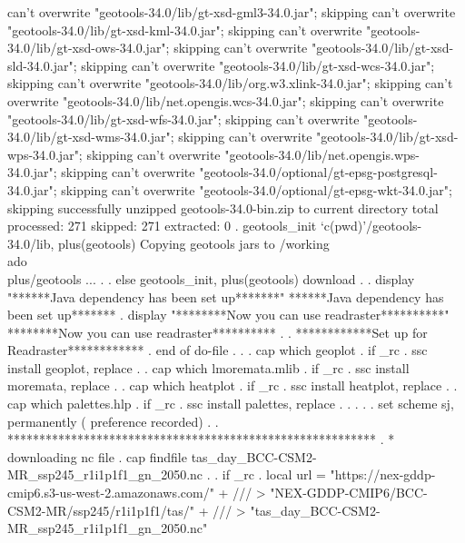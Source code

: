     can't overwrite "geotools-34.0/lib/gt-xsd-gml3-34.0.jar"; skipping
    can't overwrite "geotools-34.0/lib/gt-xsd-kml-34.0.jar"; skipping
    can't overwrite "geotools-34.0/lib/gt-xsd-ows-34.0.jar"; skipping
    can't overwrite "geotools-34.0/lib/gt-xsd-sld-34.0.jar"; skipping
    can't overwrite "geotools-34.0/lib/gt-xsd-wcs-34.0.jar"; skipping
    can't overwrite "geotools-34.0/lib/org.w3.xlink-34.0.jar"; skipping
    can't overwrite "geotools-34.0/lib/net.opengis.wcs-34.0.jar"; skipping
    can't overwrite "geotools-34.0/lib/gt-xsd-wfs-34.0.jar"; skipping
    can't overwrite "geotools-34.0/lib/gt-xsd-wms-34.0.jar"; skipping
    can't overwrite "geotools-34.0/lib/gt-xsd-wps-34.0.jar"; skipping
    can't overwrite "geotools-34.0/lib/net.opengis.wps-34.0.jar"; skipping
    can't overwrite "geotools-34.0/optional/gt-epsg-postgresql-34.0.jar"; skipping
    can't overwrite "geotools-34.0/optional/gt-epsg-wkt-34.0.jar"; skipping
{\smallskip}
successfully unzipped geotools-34.0-bin.zip to current directory
total processed:  271
        skipped:  271
      extracted:  0
.      geotools_init `c(pwd)'/geotools-34.0/lib, plus(geotools) 
Copying geotools jars to /working\\ado\\plus/geotools ...
. {\rbr}
{\smallskip}
. else geotools_init, plus(geotools) download
{\smallskip}
. 
. display "******Java dependency has been set up*******"
******Java dependency has been set up*******
{\smallskip}
. display "********Now you can use readraster**********"
********Now you can use readraster**********
{\smallskip}
. 
. ************Set up for Readraster************
. 
end of do-file
. {\rbr}
{\smallskip}
. 
. cap which geoplot
{\smallskip}
. if _rc {\lbr}
.    ssc install geoplot, replace
. {\rbr}
{\smallskip}
. cap which lmoremata.mlib
{\smallskip}
. if _rc {\lbr}
.     ssc install moremata, replace
. {\rbr}
{\smallskip}
. cap which heatplot
{\smallskip}
. if _rc {\lbr}
.     ssc install heatplot, replace
. {\rbr}
{\smallskip}
. cap which palettes.hlp
{\smallskip}
. if _rc {\lbr}
.     ssc install palettes, replace
. {\rbr}
{\smallskip}
. 
. 
. 
. set scheme sj, permanently
({} preference recorded)
{\smallskip}
. 
. **********************************************************
. * downloading nc file
. cap findfile tas_day_BCC-CSM2-MR_ssp245_r1i1p1f1_gn_2050.nc
{\smallskip}
. 
. if _rc{\lbr}
.         local url = "https://nex-gddp-cmip6.s3-us-west-2.amazonaws.com/" + ///
>                                 "NEX-GDDP-CMIP6/BCC-CSM2-MR/ssp245/r1i1p1f1/tas/" + ///
>                                 "tas_day_BCC-CSM2-MR_ssp245_r1i1p1f1_gn_2050.nc"
